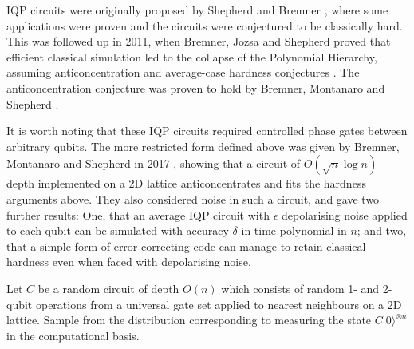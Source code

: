 IQP circuits were originally proposed by Shepherd and Bremner \cite{shepherd2009thesis, shepherd2009}, where some applications were proven and the circuits were conjectured to be classically hard. This was followed up in 2011, when Bremner, Jozsa and Shepherd proved that efficient classical simulation led to the collapse of the Polynomial Hierarchy, assuming anticoncentration and average-case hardness conjectures \cite{bremner2011}. The anticoncentration conjecture was proven to hold by Bremner, Montanaro and Shepherd \cite{bremner2016}.

It is worth noting that these IQP circuits required controlled phase gates between arbitrary qubits. The more restricted form defined above was given by Bremner, Montanaro and Shepherd in 2017 \cite{bremner2017}, showing that a circuit of $O(\sqrt{n}\log n)$ depth implemented on a 2D lattice anticoncentrates and fits the hardness arguments above. They also considered noise in such a circuit, and gave two further results: One, that an average IQP circuit with $\epsilon$ depolarising noise applied to each qubit can be simulated with accuracy $\delta$ in time polynomial in $n$; and two, that a simple form of error correcting code can manage to retain classical hardness even when faced with depolarising noise.

\begin{problem} Let $C$ be a random circuit of depth $O(n)$ which consists of random 1- and 2-qubit operations from a universal gate set applied to nearest neighbours on a 2D lattice. Sample from the distribution corresponding to measuring the state $C|0\rangle^{\otimes n}$ in the computational basis.
\end{problem}


